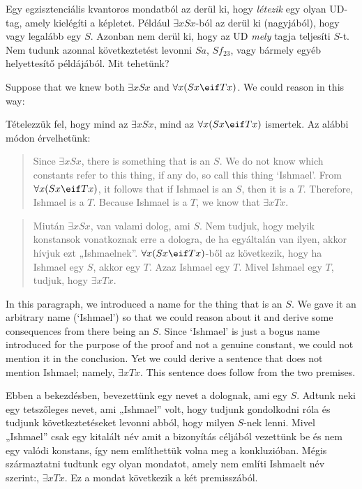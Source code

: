 Egy egzisztenciális kvantoros mondatból az derül ki, hogy \emph{létezik} egy olyan UD-tag, amely kielégíti a képletet. Például $\exists x Sx$-ból az derül ki (nagyjából), hogy  vagy legalább egy $S$. Azonban nem derül ki, hogy az UD \emph{mely} tagja teljesíti $S$-t. Nem tudunk azonnal következtetést levonni $Sa$, $Sf_{23}$, vagy bármely egyéb helyettesítő példájából. Mit tehetünk?

Suppose that we knew both $\exists x Sx$ and $\forall x(Sx \eif Tx)$. We could reason in this way:

Tételezzük fel, hogy mind az $\exists x Sx$, mind az $\forall x(Sx \eif Tx)$ ismertek. Az alábbi módon érvelhetünk:



\begin{quote}
Since $\exists x Sx$, there is something that is an $S$. We do not know which constants refer to this thing, if any do, so call this thing `Ishmael'. From $\forall x(Sx \eif Tx)$, it follows that if Ishmael is an $S$, then it is a $T$. Therefore, Ishmael is a $T$.  Because Ishmael is a $T$, we know that $\exists x Tx$.
\end{quote}

\begin{quote}
Miután $\exists x Sx$, van valami dolog, ami $S$. Nem tudjuk, hogy melyik konstansok vonatkoznak erre a dologra, de ha egyáltalán van ilyen, akkor hívjuk ezt „Ishmaelnek”. $\forall x(Sx \eif Tx)$-ből az következik, hogy ha Ishmael egy $S$, akkor egy $T$. Azaz Ishmael egy $T$.  Mivel Ishmael egy $T$, tudjuk, hogy $\exists x Tx$.
\end{quote}

In this paragraph, we introduced a name for the thing that is an $S$. We gave it an arbitrary name (`Ishmael') so that we could reason about it and derive some consequences from there being an $S$. Since `Ishmael' is just a bogus name introduced for the purpose of the proof and not a genuine constant, we could not mention it in the conclusion. Yet we could derive a sentence that does not mention Ishmael; namely, $\exists x Tx$. This sentence does follow from the two premises.

Ebben a bekezdésben, bevezettünk egy nevet a dolognak, ami egy $S$. Adtunk neki egy tetszőleges nevet, ami „Ishmael” volt, hogy tudjunk gondolkodni róla és tudjunk következtetéseket levonni abból, hogy milyen $S$-nek lenni. Mivel „Ishmael” csak egy kitalált név amit a bizonyítás céljából vezettünk be és nem egy valódi konstans, így nem említhettük volna meg a konkluzióban. Mégis származtatni tudtunk egy olyan mondatot, amely nem említi Ishmaelt név szerint:, $\exists x Tx$. Ez a mondat következik a két premisszából.

